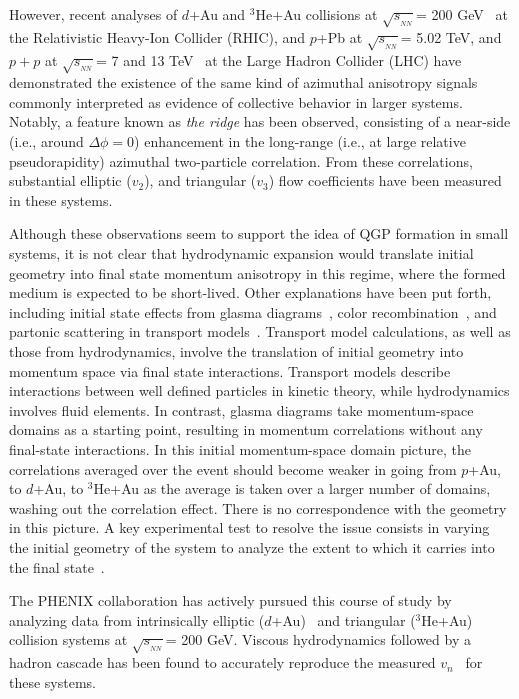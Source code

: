 \documentclass[%
reprint,
showpacs,preprintnumbers,
 amsmath,amssymb,
 aps,
]{revtex4-1}
\newcommand{\sqsn}{\mbox{$\sqrt{s_{_{NN}}}$}\xspace}
\newcommand{\dau}{\mbox{$d$+Au}\xspace}
\newcommand{\pau}{\mbox{$p$+Au}\xspace}
\newcommand{\hau}{\mbox{$^3\text{He}$+Au}\xspace}
\newcommand{\ppb}{\mbox{$p$+Pb}\xspace}
\begin{document}
However, recent analyses of \dau and \hau collisions at \sqsn = 200 GeV~\cite{Adare:2015ctn,PhysRevLett.111.212301,Adamczyk:2014fcx,PhysRevLett.115.142301} at the Relativistic Heavy-Ion Collider (RHIC), and \ppb at \sqsn = 5.02 TeV, and $p+p$ at \sqsn = 7 and 13 TeV~\cite{alice_long_2013,atlas_observation_2012,cms_observation_2012,Khachatryan:2015lva,Aad:2015gqa,Khachatryan:2010gv,Khachatryan:2016txc} at the Large Hadron Collider (LHC) have demonstrated the existence of the same kind of azimuthal anisotropy signals commonly interpreted as evidence of collective behavior in larger systems. Notably, a feature known as \textit{the ridge} has been observed, consisting of a near-side (i.e., around $\Delta \phi = 0$) enhancement in the long-range (i.e., at large relative pseudorapidity) azimuthal two-particle correlation. From these correlations, substantial elliptic ($v_2$), and triangular ($v_3$) flow coefficients have been measured in these systems.

Although these observations seem to support the idea of QGP formation in small systems, it is not clear that hydrodynamic expansion would translate initial geometry into final state momentum anisotropy in this regime, where the formed medium is expected to be short-lived. Other explanations have been put forth, including initial state effects from glasma diagrams~\cite{dusling_azimuthal_2012}, color recombination~\cite{Ortiz:2013yxa}, and partonic scattering in transport models~\cite{bzdak_elliptic_2014,ma_long-range_2014,Koop:2015wea}. Transport model calculations, as well as those from hydrodynamics, involve the translation of initial geometry into momentum space via final state interactions. Transport models describe interactions between well defined particles in kinetic theory, while hydrodynamics involves fluid elements. In contrast, glasma diagrams take momentum-space domains as a starting point, resulting in momentum correlations without any final-state interactions. In this initial momentum-space domain picture, the correlations averaged over the event should become weaker in going from \pau, to \dau, to \hau as the average is taken over a larger number of domains, washing out the correlation effect. There is no correspondence with the geometry in this picture. A key experimental test to resolve the issue consists in varying the initial geometry of the system to analyze the extent to which it carries into the final state~\cite{nagle_exploiting_2013}.

The PHENIX collaboration has actively pursued this course of study by analyzing data from intrinsically elliptic (\dau)~\cite{Adare:2015ctn,PhysRevLett.111.212301} and triangular (\hau)~\cite{Adare:2015ctn} collision systems at \sqsn = 200 GeV. Viscous hydrodynamics followed by a hadron cascade has been found to accurately reproduce the measured $v_n$~\cite{Romatschke:2015gxa,adare_measurement_2014,PhysRevLett.111.212301,Adare:2015ctn,Bozek:2015qpa} for these systems.
\end{document}
